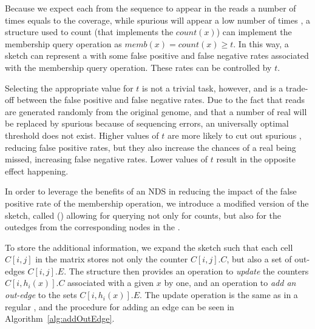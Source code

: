 Because we expect each \kmer from the sequence to appear in the reads a number of times equals to the coverage, while spurious  will appear a low number of times \cite{Conway2011} \cite{Ghosh2019}, a structure used to count  (that implements the $\mathit{count}(x)$) can implement the membership query operation as $\mathit{memb}(x)=\mathit{count}(x) \geq t$. In this way, a \cm sketch can  represent a \dBG with some false positive and false negative rates associated with the membership query operation. These rates can be controlled by $t$.

Selecting the appropriate value for $t$ is not a trivial task, however, and is a trade-off between the false positive and false negative rates. Due to the fact that reads are generated randomly from the original genome, and that a number of real  will be replaced by spurious  because of sequencing errors, an universally optimal threshold  does not exist. Higher values of $t$ are more likely to cut out spurious , reducing false positive rates, but they also increase the chances of a real \kmer being missed, increasing false negative rates. Lower values of $t$ result in the opposite effect happening.

In order to leverage the benefits of an NDS in reducing the impact of the false positive rate of the membership operation, we introduce a modified version of the \cm sketch, called \keyterm{\dB\cm} (\dBCM) allowing for querying not only for \kmer counts, but also for the outedges from the corresponding nodes in the \dBG.


To store the additional information, we expand the \cm sketch such that each cell $C[i,j]$ in the matrix stores not only the counter $C[i,j].C$, but also a set of out-edges $C[i,j].E$. The structure then provides an operation to \emph{update} the counters $C[i,h_i(x)].C$ associated with a given \kmer $x$ by one, and an operation to \emph{add an out-edge} to the sets $C[i,h_i(x)].E$. The update operation is the same as in a regular \cm, and the procedure for adding an edge can be seen in Algorithm~\ref{alg:addOutEdge}.


